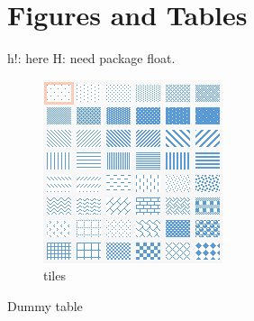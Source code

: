 \documentclass{article}
\begin{document}
	\section{Figures and Tables}
	h!: here \newline
	H: need package float.
	\begin{figure}[H]
		\includegraphics[scale=0.3]{figure.png}
		\caption{tiles}
		\label{fig:fig1}
	\end{figure}
	\begin{table}[H]
  		\caption{Dummy table}
	\end{table}
	
	\newpage
	
	\newpage
	\begin{appendix}
		\listoffigures
		\listoftables
	\end{appendix}
\end{document}
